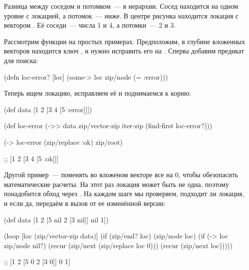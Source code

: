 
Разница между соседом и потомком~--- в иерархии. Сосед находится на одном уровне с
локацией, а потомок~--- ниже. В центре рисунка находится локация с вектором \code{[2 3]}.
Её соседи~--- числа 1 и 4, а потомки~--- 2 и 3.

\begin{figure}[H]
  \centering
  
  \label{fig:chart-zip-12}
\end{figure}

Рассмотрим функции на простых примерах. Предположим, в глубине вложенных
векторов находится ключ , и нужно исправить его на . Сперва добавим
предикат для поиска:

\begin{english}
  \begin{clojure}
(defn loc-error? [loc]
  (some-> loc zip/node (= :error)))
  \end{clojure}
\end{english}

Теперь ищем локацию, исправляем её и поднимаемся к корню:

\begin{english}
  \begin{clojure}
(def data [1 2 [3 4 [5 :error]]])

(def loc-error
  (->> data
       zip/vector-zip
       iter-zip
       (find-first loc-error?)))

(-> loc-error
    (zip/replace :ok)
    zip/root)

;; [1 2 [3 4 [5 :ok]]]
  \end{clojure}
\end{english}


Другой пример~--- поменять во вложеном векторе все  на 0, чтобы
обезопасить математические расчеты. На этот раз локация может быть не одна,
поэтому понадобится обход через . На каждом шаге мы проверяем,
подходит ли локация, и если да, передаём в  вызов  от
ее изменённой версии:

\begin{english}
  \begin{clojure}
(def data
  [1 2 [5 nil 2 [3 nil]] nil 1])

(loop [loc (zip/vector-zip data)]
  (if (zip/end? loc)
    (zip/node loc)
    (if (-> loc zip/node nil?)
      (recur (zip/next (zip/replace loc 0)))
      (recur (zip/next loc)))))

;; [1 2 [5 0 2 [3 0]] 0 1]
  \end{clojure}
\end{english}

